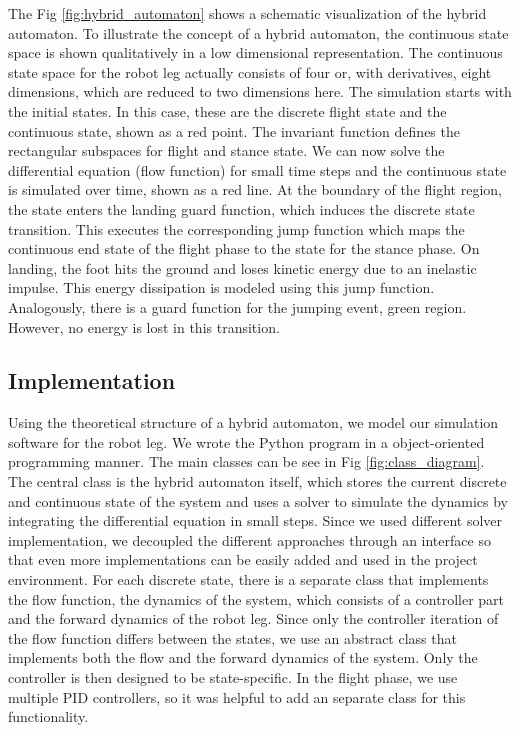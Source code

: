 \documentclass[journal,onecolumn]{IEEEtran}
\begin{document}
	The Fig \ref{fig:hybrid_automaton} shows a schematic visualization of the hybrid automaton. To illustrate the concept of a hybrid automaton, the continuous state space is shown qualitatively in a low dimensional representation. The continuous state space for the robot leg actually consists of four or, with derivatives, eight dimensions, which are reduced to two dimensions here. The simulation starts with the initial states. In this case, these are the discrete flight state and the continuous state, shown as a red point. The invariant function defines the rectangular subspaces for flight and stance state. We can now solve the differential equation (flow function) for small time steps and the continuous state is simulated over time, shown as a red line. At the boundary of the flight region, the state enters the landing guard function, which induces the discrete state transition. This executes the corresponding jump function which maps the continuous end state of the flight phase to the state for the stance phase. On landing, the foot hits the ground and loses kinetic energy due to an inelastic impulse. This energy dissipation is modeled using this jump function. Analogously, there is a guard function for the jumping event, green region. However, no energy is lost in this transition.
	
	
	\subsection{Implementation}
	Using the theoretical structure of a hybrid automaton, we model our simulation software for the robot leg. We wrote the Python program in a object-oriented programming manner. The main classes can be see in Fig \ref{fig:class_diagram}. The central class is the hybrid automaton itself, which stores the current discrete and continuous state of the system and uses a solver to simulate the dynamics by integrating the differential equation in small steps. Since we used different solver implementation, we decoupled the different approaches through an interface so that even more implementations can be easily added and used in the project environment. For each discrete state, there is a separate class that implements the flow function, the dynamics of the system, which consists of a controller part and the forward dynamics of the robot leg. Since only the controller iteration of the flow function differs between the states, we use an abstract class that implements both the flow and the forward dynamics of the system. Only the controller is then designed to be state-specific. In the flight phase, we use multiple PID controllers, so it was helpful to add an separate class for this functionality.
	
\end{document}
